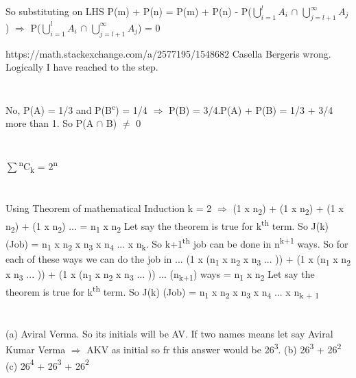 \documentclass{report}
\begin{document}
{	So substituting on LHS P(m) + P(n) = P(m) + P(n) - P({$\bigcup\limits_{i=1}^{l} A_{i}$} $\cap$ {$\bigcup\limits_{j=l+1}^{\infty} A_{j}$}) {$\Rightarrow$} P({$\bigcup\limits_{i=1}^{l} A_{i}$} $\cap$ {$\bigcup\limits_{j=l+1}^{\infty} A_{j}$}) = 0
	
	https://math.stackexchange.com/a/2577195/1548682 Casella Bergeris wrong. Logically I have reached to the step.
	
	\section{}
	No, P(A) = 1/3 and P(B{\textsuperscript{c}}) = 1/4 {$\Rightarrow$} P(B) = 3/4.P(A) + P(B) = 1/3 + 3/4 more than 1. So P(A {$\cap$} B) {$\neq$} 0
	
	\section{}
	{$\sum$}{\textsuperscript{n}C\textsubscript{k}} = 2{\textsuperscript{n}}
	
	\section{}
	Using Theorem of mathematical Induction
	k = 2 {$\Rightarrow$} (1 x n{\textsubscript{2}}) + (1 x n{\textsubscript{2}}) + (1 x n{\textsubscript{2}}) + (1 x n{\textsubscript{2}}) ... = n{\textsubscript{1}} x n{\textsubscript{2}}
	Let say the theorem is true for k{\textsuperscript{th}} term.
	So J(k) (Job) = n{\textsubscript{1}} x n{\textsubscript{2}} x n{\textsubscript{3}} x n{\textsubscript{4}} ... x n{\textsubscript{k}}. So k+1{\textsuperscript{th}} job can be done in n{\textsuperscript{k+1}} ways.
	So for each of these ways we can do the job in ... (1 x (n{\textsubscript{1}} x n{\textsubscript{2}} x n{\textsubscript{3}} ... )) + (1 x (n{\textsubscript{1}} x n{\textsubscript{2}} x n{\textsubscript{3}} ... )) + (1 x (n{\textsubscript{1}} x n{\textsubscript{2}} x n{\textsubscript{3}} ... )) ... (n{\textsubscript{k+1}}) ways = n{\textsubscript{1}} x n{\textsubscript{2}}
	Let say the theorem is true for k{\textsuperscript{th}} term.
	So J(k) (Job) = n{\textsubscript{1}} x n{\textsubscript{2}} x n{\textsubscript{3}} x n{\textsubscript{4}} ... x n{\textsubscript{k + 1}}
	
	\section{}
	(a) Aviral Verma. So its initials will be AV. If two names means let say Aviral Kumar Verma {$\Rightarrow$} AKV as initial so fr this answer would be 26{\textsuperscript{3}}.
	{\newline}
	(b) 26{\textsuperscript{3}} + 26{\textsuperscript{2}}
	{\newline}
	(c) 26{\textsuperscript{4}} + 26{\textsuperscript{3}} + 26{\textsuperscript{2}}
	
}
\end{document}

